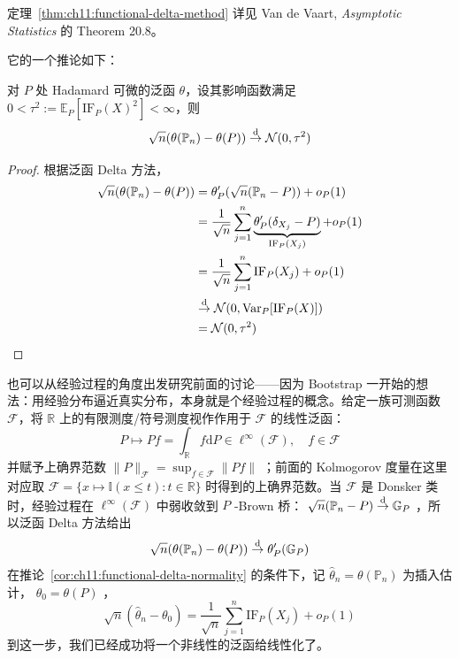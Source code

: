\begin{remark}
定理~\ref{thm:ch11:functional-delta-method} 详见 Van de Vaart, \emph{Asymptotic Statistics} 的 Theorem 20.8。
\end{remark}

它的一个推论如下：

\begin{corollary}\label{cor:ch11:functional-delta-normality}
对 $P$ 处 Hadamard 可微的泛函 $\theta$，设其影响函数满足 $0<\tau^2:=\mathbb E_P[\mathrm{IF}_P(X)^2]<\infty$，则
\[\sqrt n(\theta(\mathbb P_n)-\theta(P))\overset{\rm d}\to \mathcal N(0,\tau^2)\]
\end{corollary}

\begin{proof}

根据泛函 Delta 方法，
\[\begin{aligned} \sqrt n(\theta(\mathbb P_n)-\theta(P))&=\theta'_P(\sqrt n(\mathbb P_n-P))+o_P(1)\\ &=\frac1{\sqrt n}\sum_{j=1}^n\underbrace{\theta'_P(\delta_{X_j}-P)}_{\mathrm{IF}_P(X_j)}+o_P(1)\\  &=\frac1{\sqrt n}\sum_{j=1}^n\mathrm{IF}_P(X_j)+o_P(1)\\ &\overset{\rm d}\to\mathcal N(0,\mathrm{Var}_P[\mathrm{IF}_P(X)])\\ &=\mathcal N(0,\tau^2) \end{aligned}\]
\end{proof}

\begin{remark}
也可以从经验过程的角度出发研究前面的讨论------因为 Bootstrap 一开始的想法：用经验分布逼近真实分布，本身就是个经验过程的概念。给定一族可测函数 $\mathscr F$，将 $\mathbb R$ 上的有限测度/符号测度视作作用于 $\mathscr F$ 的线性泛函：
\[P\mapsto Pf= \int_{\mathbb R}f\mathrm dP\in\ell^\infty(\mathscr F),\quad f\in\mathscr F\]
并赋予上确界范数 $\|P\|_{\mathscr F}=\sup_{f\in\mathscr F}\|Pf\|$ ；前面的 Kolmogorov 度量在这里对应取 $\mathscr F=\{x\mapsto \mathbb I(x\le t):t\in\mathbb R\}$ 时得到的上确界范数。当 $\mathscr F$ 是 Donsker 类时，经验过程在 $\ell^\infty(\mathscr F)$ 中弱收敛到 $P$ -Brown 桥： $\sqrt n(\mathbb P_n-P)\overset{\rm d}\to \mathbb G_P$ ，所以泛函 Delta 方法给出
\[\sqrt n(\theta(\mathbb P_n)-\theta(P))\overset{\rm d}\to \theta'_P(\mathbb G_P)\]
在推论~\ref{cor:ch11:functional-delta-normality} 的条件下，记 $\widehat\theta_n=\theta(\mathbb P_n)$ 为插入估计， $\theta_0=\theta(P)$ ，
\[\sqrt n(\widehat\theta_n-\theta_0)=\frac1{\sqrt n}\sum_{j=1}^n\mathrm{IF}_P(X_j)+o_P(1)\]
到这一步，我们已经成功将一个非线性的泛函给线性化了。
\end{remark}

